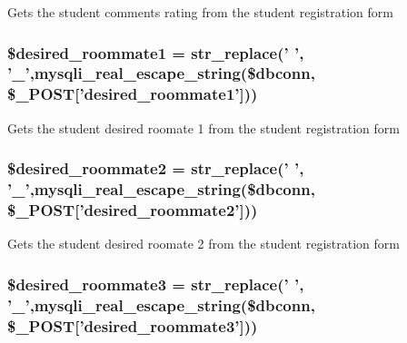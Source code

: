\-Gets the student comments rating from the student registration form \hypertarget{user__view_2validate_2studentVal_8php_a9c454efdb922da9127af82e94ee399a1}{
\subsubsection[{\$desired\-\_\-roommate1}]{\setlength{\rightskip}{0pt plus 5cm}\$desired\-\_\-roommate1 = str\-\_\-replace(' ', '\-\_\-',mysqli\-\_\-real\-\_\-escape\-\_\-string(\$dbconn, \$\-\_\-\-P\-O\-S\-T\mbox{[}'desired\-\_\-roommate1'\mbox{]}))}}\label{user__view_2validate_2studentVal_8php_a9c454efdb922da9127af82e94ee399a1}
\-Gets the student desired roomate 1 from the student registration form \hypertarget{user__view_2validate_2studentVal_8php_aeaab2ccbd0e9359193a66a1c07606bf8}{
\subsubsection[{\$desired\-\_\-roommate2}]{\setlength{\rightskip}{0pt plus 5cm}\$desired\-\_\-roommate2 = str\-\_\-replace(' ', '\-\_\-',mysqli\-\_\-real\-\_\-escape\-\_\-string(\$dbconn, \$\-\_\-\-P\-O\-S\-T\mbox{[}'desired\-\_\-roommate2'\mbox{]}))}}\label{user__view_2validate_2studentVal_8php_aeaab2ccbd0e9359193a66a1c07606bf8}
\-Gets the student desired roomate 2 from the student registration form \hypertarget{user__view_2validate_2studentVal_8php_a6c6068b6183d30d97211b0acc4c44e97}{
\subsubsection[{\$desired\-\_\-roommate3}]{\setlength{\rightskip}{0pt plus 5cm}\$desired\-\_\-roommate3 = str\-\_\-replace(' ', '\-\_\-',mysqli\-\_\-real\-\_\-escape\-\_\-string(\$dbconn, \$\-\_\-\-P\-O\-S\-T\mbox{[}'desired\-\_\-roommate3'\mbox{]}))}}\label{user__view_2validate_2studentVal_8php_a6c6068b6183d30d97211b0acc4c44e97}
